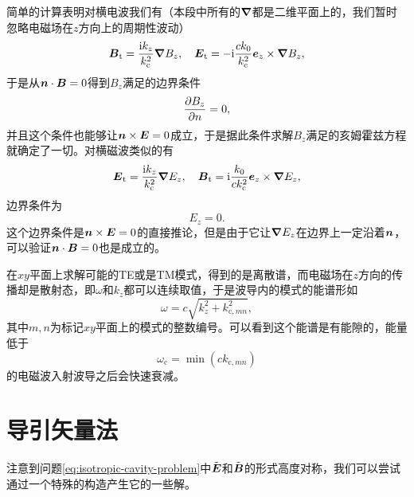 简单的计算表明对横电波我们有（本段中所有的$\grad$都是二维平面上的，我们暂时忽略电磁场在$z$方向上的周期性波动）
\begin{equation}
    \vb*{B}_\text{t} = \frac{\mathrm{i} k_z}{k_\text{c}^2} \grad{B_z}, \quad \vb*{E}_\text{t} = - \mathrm{i} \frac{c k_0}{k_\text{c}^2} \vb*{e}_z \times \grad{B_z},
\end{equation}
于是从$\vb*{n} \cdot \vb*{B} = 0$得到$B_z$满足的边界条件
\begin{equation}
    \pdv{B_z}{n} = 0,
\end{equation}
并且这个条件也能够让$\vb*{n} \times \vb*{E} = 0$成立，于是据此条件求解$B_z$满足的亥姆霍兹方程就确定了一切。对横磁波类似的有
\begin{equation}
    \vb*{E}_\text{t} = \frac{\mathrm{i} k_z}{k_\text{c}^2} \grad{E_z}, \quad \vb*{B}_\text{t} = \mathrm{i} \frac{k_0}{ck_\text{c}^2} \vb*{e}_z \times \grad{E_z},
\end{equation}
边界条件为
\begin{equation}
    E_z = 0.
\end{equation}
这个边界条件是$\vb*{n} \times \vb*{E}=0$的直接推论，但是由于它让$\grad{E_z}$在边界上一定沿着$\vb*{n}$，可以验证$\vb*{n} \cdot \vb*{B}=0$也是成立的。

在$xy$平面上求解可能的TE或是TM模式，得到的是离散谱，而电磁场在$z$方向的传播却是散射态，即$\omega$和$k_z$都可以连续取值，于是波导内的模式的能谱形如
\begin{equation}
    \omega = c \sqrt{k_z^2 + k_{\text{c}, mn}^2},
\end{equation}
其中$m, n$为标记$xy$平面上的模式的整数编号。可以看到这个能谱是有能隙的，能量低于
\begin{equation}
    \omega_\text{c} = \min (c k_{\text{c}, mn})
\end{equation}
的电磁波入射波导之后会快速衰减。

\section{导引矢量法}

注意到问题\eqref{eq:isotropic-cavity-problem}中$\tilde{\vb*{E}}$和$\tilde{\vb*{B}}$的形式高度对称，我们可以尝试通过一个特殊的构造产生它的一些解。

